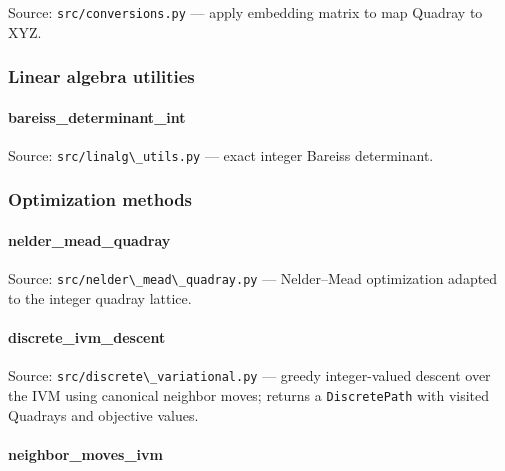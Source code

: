 \documentclass[
  10pt,
]{article}
\newcommand{\passthrough}[1]{#1}
\renewcommand{\texttt}[1]{%
    \colorbox{codebg}{\color{codefg}\ttfamily #1}%
}
\begin{document}
Source: \passthrough{\lstinline!src/conversions.py!} --- apply embedding
matrix to map Quadray to XYZ.

\hypertarget{code:linear_algebra}{%
\subsubsection{Linear algebra utilities}\label{code:linear_algebra}}

\hypertarget{code:bareiss_determinant_int}{%
\paragraph{\texorpdfstring{\texttt{bareiss\_determinant\_int}}{bareiss\_determinant\_int}}\label{code:bareiss_determinant_int}}

Source: \passthrough{\lstinline!src/linalg\_utils.py!} --- exact integer
Bareiss determinant.

\hypertarget{code:optimization}{%
\subsubsection{Optimization methods}\label{code:optimization}}

\hypertarget{code:nelder_mead_quadray}{%
\paragraph{\texorpdfstring{\texttt{nelder\_mead\_quadray}}{nelder\_mead\_quadray}}\label{code:nelder_mead_quadray}}

Source: \passthrough{\lstinline!src/nelder\_mead\_quadray.py!} ---
Nelder--Mead optimization adapted to the integer quadray lattice.

\hypertarget{code:discrete_ivm_descent}{%
\paragraph{\texorpdfstring{\texttt{discrete\_ivm\_descent}}{discrete\_ivm\_descent}}\label{code:discrete_ivm_descent}}

Source: \passthrough{\lstinline!src/discrete\_variational.py!} ---
greedy integer-valued descent over the IVM using canonical neighbor
moves; returns a \passthrough{\lstinline!DiscretePath!} with visited
Quadrays and objective values.

\hypertarget{code:neighbor_moves_ivm}{%
\paragraph{\texorpdfstring{\texttt{neighbor\_moves\_ivm}}{neighbor\_moves\_ivm}}\label{code:neighbor_moves_ivm}}
\end{document}
